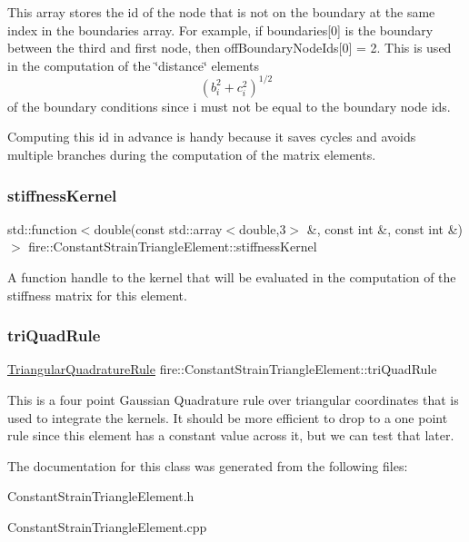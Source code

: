 This array stores the id of the node that is not on the boundary at the same index in the boundaries array. For example, if boundaries\mbox{[}0\mbox{]} is the boundary between the third and first node, then off\+Boundary\+Node\+Ids\mbox{[}0\mbox{]} = 2. This is used in the computation of the \char`\"{}distance\char`\"{} elements \[ (b_{i}^{2} + c_{i}^{2})^{1/2} \] of the boundary conditions since i must not be equal to the boundary node ids.

Computing this id in advance is handy because it saves cycles and avoids multiple branches during the computation of the matrix elements. \mbox{\label{a00773_ae2480b5335fe78245cb1006e3eeb034d}} 
\subsubsection{\texorpdfstring{stiffness\+Kernel}{stiffnessKernel}}
{\footnotesize\ttfamily std\+::function$<$double(const std\+::array$<$double,3$>$ \&, const int \&, const int \&)$>$ fire\+::\+Constant\+Strain\+Triangle\+Element\+::stiffness\+Kernel\hspace{0.3cm}{\ttfamily [protected]}}

A function handle to the kernel that will be evaluated in the computation of the stiffness matrix for this element. \mbox{\label{a00773_a5e50303ae2cfb783f44de143be8a9aac}} 
\subsubsection{\texorpdfstring{tri\+Quad\+Rule}{triQuadRule}}
{\footnotesize\ttfamily \hyperlink{a00869}{Triangular\+Quadrature\+Rule} fire\+::\+Constant\+Strain\+Triangle\+Element\+::tri\+Quad\+Rule\hspace{0.3cm}{\ttfamily [protected]}}

This is a four point Gaussian Quadrature rule over triangular coordinates that is used to integrate the kernels. It should be more efficient to drop to a one point rule since this element has a constant value across it, but we can test that later. 

The documentation for this class was generated from the following files\+:\begin{DoxyCompactItemize}
\item 
Constant\+Strain\+Triangle\+Element.\+h\item 
Constant\+Strain\+Triangle\+Element.\+cpp\end{DoxyCompactItemize}
